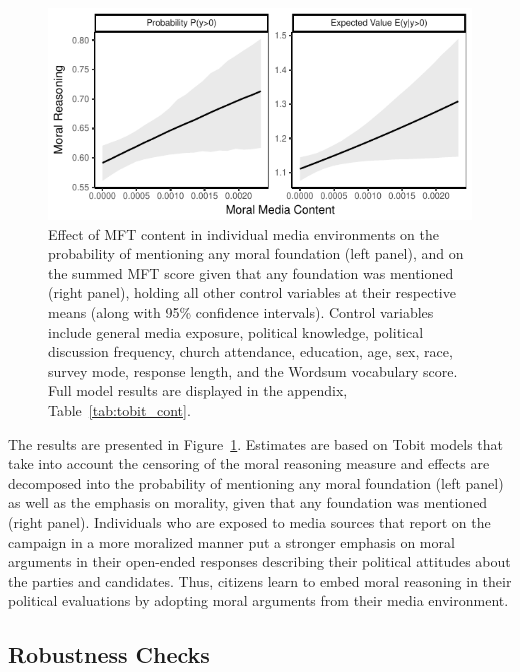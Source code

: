 \documentclass[12pt]{article}
\begin{document}
\begin{figure}[h]\centering
\includegraphics{../calc/fig/tobit_media.pdf}
\caption{Effect of MFT content in individual media environments on the probability of mentioning any moral foundation (left panel), and on the summed MFT score given that any foundation was mentioned (right panel), holding all other control variables at their respective means (along with 95\% confidence intervals). Control variables include general media exposure, political knowledge, political discussion frequency, church attendance, education, age, sex, race, survey mode, response length, and the Wordsum vocabulary score. Full model results are displayed in the appendix, Table~\ref{tab:tobit_cont}.
}\label{fig:tobit_media}
\end{figure}

The results are presented in Figure~\ref{fig:tobit_media}. Estimates are based on Tobit models that take into account the censoring of the moral reasoning measure and effects are decomposed into the probability of mentioning any moral foundation (left panel) as well as the emphasis on morality, given that any foundation was mentioned (right panel). Individuals who are exposed to media sources that report on the campaign in a more moralized manner put a stronger emphasis on moral arguments in their open-ended responses describing their political attitudes about the parties and candidates. Thus, citizens learn to embed moral reasoning in their political evaluations by adopting moral arguments from their media environment.



\subsection*{Robustness Checks}
\end{document}
